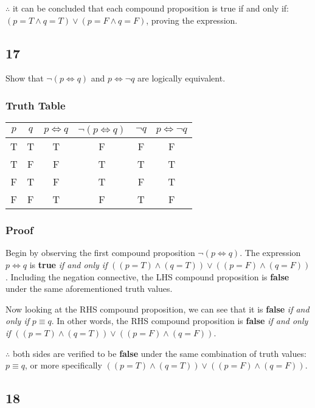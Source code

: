 \documentclass{article}
\begin{document}
$ \therefore $ it can be concluded that each compound proposition is true if and only if: $ ( p = T \land q = T ) \lor ( p = F \land q = F ) $, proving the expression.

\subsection{17}

Show that $ \neg ( p \iff q ) $ and $ p \iff \neg q $ are logically equivalent.

\subsubsection{Truth Table}

\begin{tabular}{ | c | c | c | c | c | c | }
	$ p $ & $ q $ & $ p \iff q $ & $ \neg ( p \iff q ) $ & $ \neg q $ & $ p \iff \neg q $ \\
	\hline
	T & T & T & F & F & F \\
	T & F & F & T & T & T \\
	F & T & F & T & F & T \\
	F & F & T & F & T & F
\end{tabular}

\subsubsection{Proof}

Begin by observing the first compound proposition $ \neg ( p \iff q ) $. The expression $ p \iff q $ is \textbf{true} \textit{if and only if} $ ( ( p = T ) \land ( q = T ) ) \lor ( ( p = F ) \land ( q = F ) ) $. Including the negation connective, the LHS compound proposition is \textbf{false} under the same aforementioned truth values.

Now looking at the RHS compound proposition, we can see that it is \textbf{false} \textit{if and only if} $ p \equiv q $. In other words, the RHS compound proposition is \textbf{false} \textit{if and only if} $ ( ( p = T ) \land ( q = T ) ) \lor ( ( p = F ) \land ( q = F ) ) $.

$ \therefore $ both sides are verified to be \textbf{false} under the same combination of truth values: $ p \equiv q $, or more specifically $ ( ( p = T ) \land ( q = T ) ) \lor ( ( p = F ) \land ( q = F ) ) $.

\subsection{18}
\end{document}
